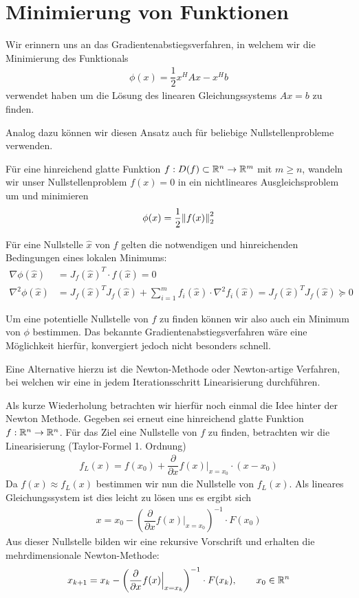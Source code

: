 
\section{Minimierung von Funktionen}
Wir erinnern uns an das Gradientenabstiegsverfahren, in welchem wir die Minimierung des Funktionals 
%
\begin{align*}
  \phi(x) = \dfrac{1}{2}x^HAx - x^Hb 
\end{align*}
%
verwendet haben um die Lösung des linearen Gleichungssystems $Ax=b$ zu finden. 

Analog dazu können wir diesen Ansatz auch für beliebige Nullstellenprobleme verwenden. 

Für eine hinreichend glatte Funktion $f:D(f)\subset \mathbb R^n\to\mathbb R^m$ mit $m\geq n$, 
wandeln wir unser Nullstellenproblem $f(x)=0$ in ein nichtlineares Ausgleichsproblem um und minimieren 
%
\begin{align*}
  \phi(x) = \dfrac{1}{2}\vertn{2}{f(x)}_2^2
\end{align*}

Für eine Nullstelle $\hat{x}$ von $f$ gelten die notwendigen und hinreichenden Bedingungen eines lokalen Minimums:
%
\begin{align*}
  \nabla \phi(\hat{x}) 
  &= J_f(\hat{x})^T \cdot f(\hat{x}) = 0\\
  \nabla^2 \phi(\hat{x}) 
  &= J_f(\hat{x})^TJ_f(\hat{x}) + \sum_{i=1}^{m} f_i(\hat{x})\cdot \nabla^2 f_i(\hat{x}) 
  = J_f(\hat{x})^TJ_f(\hat{x}) \succeq 0
\end{align*}
%

Um eine potentielle Nullstelle von $f$ zu finden können wir also auch ein Minimum von $\phi$ bestimmen. Das 
bekannte Gradientenabstiegsverfahren wäre eine Möglichkeit hierfür, konvergiert jedoch nicht besonders schnell.

Eine Alternative hierzu ist die Newton-Methode oder Newton-artige Verfahren, bei welchen wir eine in jedem 
Iterationsschritt Linearisierung durchführen.

Als kurze Wiederholung betrachten wir hierfür noch einmal die Idee hinter der Newton Methode. Gegeben sei erneut 
eine hinreichend glatte Funktion $f:\mathbb R^n\to\mathbb R^n$. Für das Ziel eine Nullstelle von $f$ zu finden, betrachten wir 
die Linearisierung (Taylor-Formel 1. Ordnung)
%
\begin{align*}
  f_L(x) = f(x_0) + \dfrac{\partial }{\partial x} f(x) \Big|_{x=x_0}\cdot (x-x_0)
\end{align*}
%
Da $f(x) \approx f_L(x)$ bestimmen wir nun die Nullstelle von $f_L(x)$. Als lineares Gleichungssystem ist dies leicht 
zu lösen uns es ergibt sich 
%
\begin{align*}
  x = x_0 - \left(\dfrac{\partial }{\partial x} f(x) \Big|_{x=x_0}\right)^{-1}\cdot F(x_0)
\end{align*}
%
Aus dieser Nullstelle bilden wir eine rekursive Vorschrift und erhalten die mehrdimensionale Newton-Methode:
%
\begin{align*}
  x_{k+1} = x_k - \left(\dfrac{\partial }{\partial x} f(x) \Big|_{x=x_k}\right)^{-1}\cdot F(x_k),
  \qquad x_0\in\mathbb R^n
\end{align*}
%

